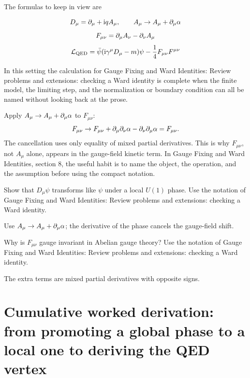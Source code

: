 The formulas to keep in view are

\[
  D_\mu=\partial_\mu+\mathrm i qA_\mu,\qquad A_\mu\to A_\mu+\partial_\mu\alpha
\]
\[
  F_{\mu\nu}=\partial_\mu A_\nu-\partial_\nu A_\mu
\]
\[
  \mathcal L_{\mathrm{QED}}=\bar\psi(\mathrm i\gamma^\mu D_\mu-m)\psi-\frac14F_{\mu\nu}F^{\mu\nu}
\]

In this setting the calculation for Gauge Fixing and Ward Identities: Review problems and extensions: checking a Ward identity is complete when the finite model, the limiting step, and the normalization or boundary condition can all be named without looking back at the prose.




\begin{example}
Apply \(A_\mu\to A_\mu+\partial_\mu\alpha\) to \(F_{\mu\nu}\):
\[
  F_{\mu\nu}\to F_{\mu\nu}+\partial_\mu\partial_\nu\alpha-\partial_\nu\partial_\mu\alpha=F_{\mu\nu}.
\]
The cancellation uses only equality of mixed partial derivatives.  This is why \(F_{\mu\nu}\), not \(A_\mu\) alone, appears in the gauge-field kinetic term.  In Gauge Fixing and Ward Identities, section 8, the useful habit is to name the object, the operation, and the assumption before using the compact notation.
\end{example}



\begin{exercise}
Show that \(D_\mu\psi\) transforms like \(\psi\) under a local \(U(1)\) phase.  Use the notation of Gauge Fixing and Ward Identities: Review problems and extensions: checking a Ward identity.
\begin{answer}
Use \(A_\mu\to A_\mu+\partial_\mu\alpha\); the derivative of the phase cancels the gauge-field shift.
\end{answer}
\end{exercise}

\begin{exercise}
Why is \(F_{\mu\nu}\) gauge invariant in Abelian gauge theory?  Use the notation of Gauge Fixing and Ward Identities: Review problems and extensions: checking a Ward identity.
\begin{answer}
The extra terms are mixed partial derivatives with opposite signs.
\end{answer}
\end{exercise}



\section{Cumulative worked derivation: from promoting a global phase to a local one to deriving the QED vertex}

